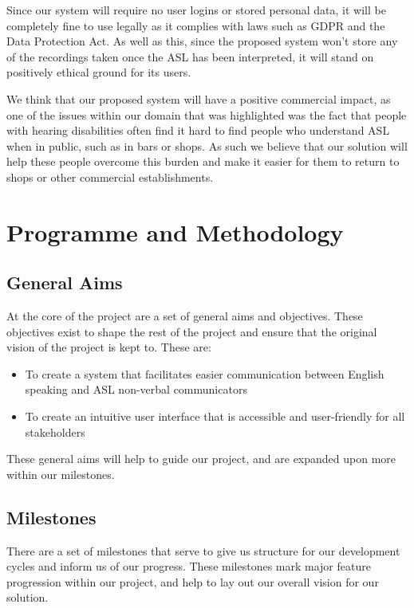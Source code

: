 \documentclass[10pt]{article}
\begin{document}
Since our system will require no user logins or stored personal data, it will be completely fine to 
use legally as it complies with laws such as GDPR and the Data Protection Act. As well as this, 
since the proposed system won't store any of the recordings taken once the ASL has been interpreted, 
it will stand on positively ethical ground for its users.

We think that our proposed system will have a positive commercial impact, as one of the issues 
within our domain that was highlighted was the fact that people with hearing disabilities often find 
it hard to find people who understand ASL when in public, such as in bars or shops. As such we 
believe that our solution will help these people overcome this burden and make it easier for them to 
return to shops or other commercial establishments.

\section{Programme and Methodology}
\subsection{General Aims}

At the core of the project are a set of general aims and objectives. These objectives exist to 
shape the rest of the project and ensure that the original vision of the project is kept to. These 
are: 

\begin{itemize}
  \item To create a system that facilitates easier communication between English speaking and ASL 
    non-verbal communicators
  \item To create an intuitive user interface that is accessible and user-friendly for all 
    stakeholders
\end{itemize}

These general aims will help to guide our project, and are expanded upon more within our milestones.

\subsection{Milestones}

There are a set of milestones that serve to give us structure for our development cycles and 
inform us of our progress. These milestones mark major feature progression within our project, and 
help to lay out our overall vision for our solution.
\end{document}
